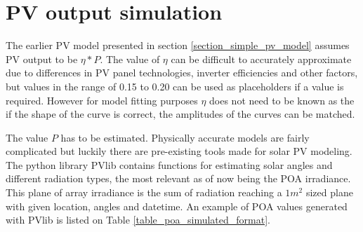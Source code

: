 \chapter{PV output simulation}
The earlier PV model presented in section \ref{section_simple_pv_model} assumes PV output to be $\eta * P$. The value of $\eta$ can be difficult to accurately approximate due to differences in PV panel technologies, inverter efficiencies and other factors, but values in the range of 0.15 to 0.20 can be used as placeholders if a value is required. However for model fitting purposes $\eta$ does not need to be known as the if the shape of the curve is correct, the amplitudes of the curves can be matched.

The value $P$ has to be estimated. Physically accurate models are fairly complicated but luckily there are pre-existing tools made for solar PV modeling. The python library PVlib contains functions for estimating solar angles and different radiation types, the most relevant as of now being the POA irradiance. This plane of array irradiance is the sum of radiation reaching a $1m^2$ sized plane with given location, angles and datetime. An example of POA values generated with PVlib is listed on Table \ref{table_poa_simulated_format}.














